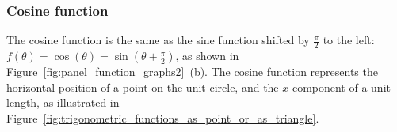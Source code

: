 

		\subsubsection{Cosine function}

			The cosine function is the same as the sine function shifted by $\frac{\pi}{2}$ to the left:
			$f(\theta) = \cos(\theta) = \sin(\theta+\frac{\pi}{2})$,
			as shown in Figure~\ref{fig:panel_function_graphs2}~(b).
			The cosine function represents the horizontal position of a point on the unit circle,
			and the $x$-component of a unit length,
			as illustrated in Figure~\ref{fig:trigonometric_functions_as_point_or_as_triangle}.


